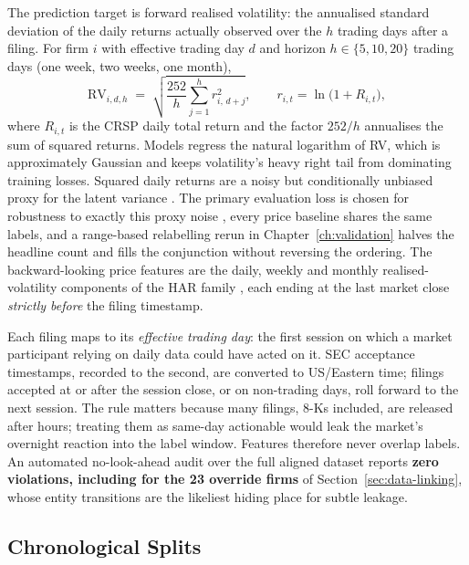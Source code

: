 The prediction target is forward realised volatility: the annualised standard deviation of the daily returns actually observed over the $h$ trading days after a filing. For firm $i$ with effective trading day $d$ and horizon $h \in \{5, 10, 20\}$ trading days (one week, two weeks, one month), %
\begin{equation}
\label{eq:data-rv}
\mathrm{RV}_{i,d,h} \;=\; \sqrt{\frac{252}{h}\sum_{j=1}^{h} r_{i,\,d+j}^{2}},
\qquad r_{i,t} = \ln\!\bigl(1+R_{i,t}\bigr),
\end{equation}
where $R_{i,t}$ is the CRSP daily total return and the factor $252/h$ annualises the sum of squared returns. Models regress the natural logarithm of RV, which is approximately Gaussian and keeps volatility's heavy right tail from dominating training losses. Squared daily returns are a noisy but conditionally unbiased proxy for the latent variance \cite{andersen2003modeling}. The primary evaluation loss is chosen for robustness to exactly this proxy noise \cite{patton2011proxies}, every price baseline shares the same labels, and a range-based relabelling rerun in Chapter~\ref{ch:validation} halves the headline count and fills the conjunction without reversing the ordering. The backward-looking price features are the daily, weekly and monthly realised-volatility components of the HAR family \cite{corsi2009har}, each ending at the last market close \emph{strictly before} the filing timestamp.

Each filing maps to its \emph{effective trading day}: the first session on which a market participant relying on daily data could have acted on it. SEC acceptance timestamps, recorded to the second, are converted to US/Eastern time; filings accepted at or after the session close, or on non-trading days, roll forward to the next session. %
The rule matters because many filings, 8-Ks included, are released after hours; treating them as same-day actionable would leak the market's overnight reaction into the label window. Features therefore never overlap labels. An automated no-look-ahead audit over the full aligned dataset reports \textbf{zero violations, including for the 23 override firms} of Section~\ref{sec:data-linking}, whose entity transitions are the likeliest hiding place for subtle leakage. %

\subsection{Chronological Splits}
\label{sec:data-splits}


